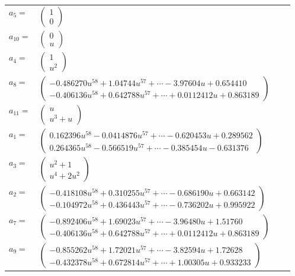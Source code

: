 \documentclass[1p]{elsarticle_modified}
\theoremstyle{definition}
\begin{document}
\begin{tabular}{m{7pt} m{180pt} m{7pt} m{180pt} }
\flushright $a_{5}=$&$\begin{pmatrix}1\\0\end{pmatrix}$ \\
\flushright $a_{10}=$&$\begin{pmatrix}0\\u\end{pmatrix}$ \\
\flushright $a_{4}=$&$\begin{pmatrix}1\\u^2\end{pmatrix}$ \\
\flushright $a_{8}=$&$\begin{pmatrix}-0.486270 u^{58}+1.04744 u^{57}+\cdots-3.97604 u+0.654410\\-0.406136 u^{58}+0.642788 u^{57}+\cdots+0.0112412 u+0.863189\end{pmatrix}$ \\
\flushright $a_{11}=$&$\begin{pmatrix}u\\u^3+u\end{pmatrix}$ \\
\flushright $a_{1}=$&$\begin{pmatrix}0.162396 u^{58}-0.0414876 u^{57}+\cdots-0.620453 u+0.289562\\0.264365 u^{58}-0.566519 u^{57}+\cdots-0.385454 u-0.631376\end{pmatrix}$ \\
\flushright $a_{3}=$&$\begin{pmatrix}u^2+1\\u^4+2 u^2\end{pmatrix}$ \\
\flushright $a_{2}=$&$\begin{pmatrix}-0.418108 u^{58}+0.310255 u^{57}+\cdots-0.686190 u+0.663142\\-0.104972 u^{58}+0.436443 u^{57}+\cdots-0.736202 u+0.995922\end{pmatrix}$ \\
\flushright $a_{7}=$&$\begin{pmatrix}-0.892406 u^{58}+1.69023 u^{57}+\cdots-3.96480 u+1.51760\\-0.406136 u^{58}+0.642788 u^{57}+\cdots+0.0112412 u+0.863189\end{pmatrix}$ \\
\flushright $a_{9}=$&$\begin{pmatrix}-0.855262 u^{58}+1.72021 u^{57}+\cdots-3.82594 u+1.72628\\-0.432378 u^{58}+0.672814 u^{57}+\cdots+1.00305 u+0.933233\end{pmatrix}$ \\

\end{tabular}
\end{document}
